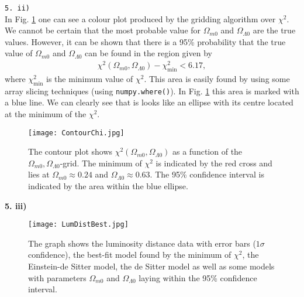 \documentclass{emulateapj}
\begin{document}
 	\texttt{5. ii)}\\
 	In Fig. \ref{fig:Contour} one can see a colour plot produced by the gridding algorithm over $\chi^2$. We cannot be certain that the most probable value for $\Omega_{m 0}$ and $\Omega_{\Lambda 0}$ are the true values. However, it can be shown that there is a 95\% probability that the true value of $\Omega_{m 0}$ and $\Omega_{\Lambda 0}$ can be found in the region given by 
 	\begin{align}
 		\chi^2(\Omega_{m 0}, \Omega_{\Lambda 0}) - \chi^2_\text{min} < 6.17,
 	\end{align} 
 	where $\chi^2_\text{min}$ is the minimum value of $\chi^2$. This area is easily found by using some array slicing techniques (using \texttt{numpy.where()}). In Fig. \ref{fig:Contour} this area is marked with a blue line. We can clearly see that is looks like an ellipse with its centre located at the minimum of the $\chi^2$. \\
 	
 	\begin{figure}
 		\texttt{[image: ContourChi.jpg]}
 		\caption{The contour plot shows $\chi^2(\Omega_{m 0}, \Omega_{\Lambda 0})$ as a function of the $\Omega_{m 0},\Omega_{\Lambda 0}$-grid. The minimum of $\chi^2$ is indicated by the red cross and lies at $\Omega_{m 0} \approx 0.24$ and $\Omega_{\Lambda 0} \approx 0.63$. The 95\% confidence interval is indicated by the area within the blue ellipse.}
 		\label{fig:Contour}
 	\end{figure}
 	\textbf{5. iii)}
 	
 	
 	\begin{figure}
 		\texttt{[image: LumDistBest.jpg]}
 		\caption{The graph shows the luminosity distance data with error bars ($1\sigma$ confidence), the best-fit model found by the minimum of $\chi^2$, the Einstein-de Sitter model, the de Sitter model as well as some models with parameters $\Omega_{m 0}$ and $\Omega_{\Lambda 0}$ laying within the 95\% confidence interval.}
 		\label{fig:bestfit}
 	\end{figure}
 	
\end{document}
